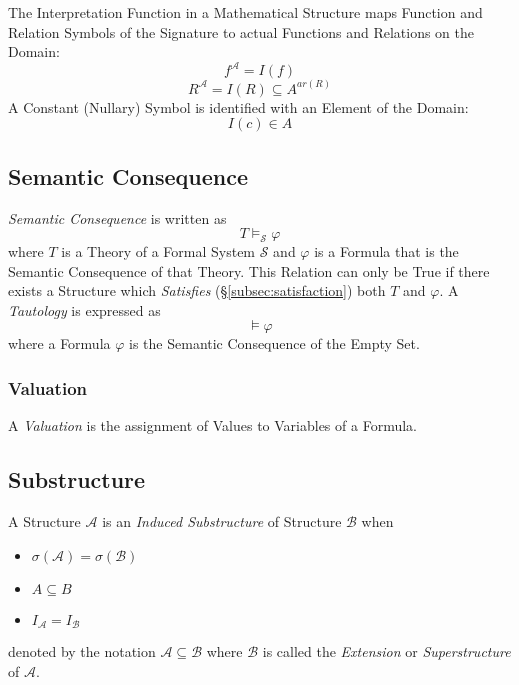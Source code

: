 \documentclass{article}
\begin{document}
The Interpretation Function in a Mathematical Structure maps Function
and Relation Symbols of the Signature to actual Functions and
Relations on the Domain:
\[
    f^{\mathcal{A}} = I (f)
\]
\[
    R^{\mathcal{A}} = I (R) \subseteq A^{ar(R)}
\]
A Constant (Nullary) Symbol is identified with an Element of the
Domain:
\[
    I(c) \in A
\]

\subsection{Semantic Consequence}\label{subsec:semantic_consequence}

\emph{Semantic Consequence} is written as
\[
    T \vDash_{\mathcal{S}} \varphi
\]
where $T$ is a Theory of a Formal System $\mathcal{S}$ and $\varphi$
is a Formula that is the Semantic Consequence of that Theory. This
Relation can only be True if there exists a Structure which
\emph{Satisfies} (\S\ref{subsec:satisfaction}) both $T$ and
$\varphi$. A \emph{Tautology} is expressed as
\[
    \vDash {\varphi}
\]
where a Formula $\varphi$ is the Semantic Consequence of the Empty
Set.

\subsubsection{Valuation}\label{subsec:model_valuation}

A \emph{Valuation} is the assignment of Values to Variables of a
Formula.

\subsection{Substructure}\label{subsec:model_substructure}

A Structure $\mathcal{A}$ is an \emph{Induced Substructure} of
Structure $\mathcal{B}$ when
\begin{itemize}
\item $\sigma(\mathcal{A}) = \sigma(\mathcal{B})$
\item $A \subseteq B$
\item $I_{\mathcal{A}}=I_{\mathcal{B}}$
\end{itemize}
denoted by the notation $\mathcal{A} \subseteq \mathcal{B}$ where
$\mathcal{B}$ is called the \emph{Extension} or \emph{Superstructure}
of $\mathcal{A}$.
\end{document}
